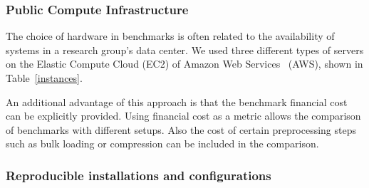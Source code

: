 
%

\subsubsection{Public Compute Infrastructure}

The choice of hardware in benchmarks is often related to the availability of systems in a research group's data center.
We used three different types of servers on the Elastic Compute Cloud (EC2) of Amazon Web Services~\cite{ec2} (AWS), shown in Table~\ref{instances}. 

\begin{table}[ht!]
	\centering
	\caption{Instance types used in benchmarks and their purpose.}
	\label{instances}
\end{table}

An additional advantage of this approach is that the benchmark financial cost can be explicitly provided. Using financial cost as a metric allows the comparison of benchmarks with different setups. Also the cost of certain preprocessing steps such as bulk loading or compression can be included in the comparison.

\subsubsection{Reproducible installations and configurations}


